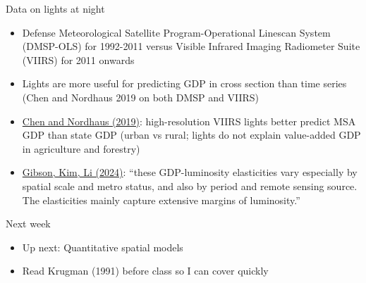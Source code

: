 \documentclass[11pt,notes=hide,aspectratio=169]{beamer}
\begin{document}
\begin{frame}{Data on lights at night}
\begin{itemize}
	\item Defense Meteorological Satellite Program-Operational Linescan System (DMSP-OLS) for 1992-2011
	versus
	Visible Infrared Imaging Radiometer Suite (VIIRS) for 2011 onwards
	\item Lights are more useful for predicting GDP in cross section than time series (Chen and Nordhaus 2019 on both DMSP and VIIRS)
	\item \href{https://www.mdpi.com/2072-4292/11/9/1057}{Chen and Nordhaus (2019)}: high-resolution VIIRS lights better predict MSA GDP than state GDP (urban vs rural; lights do not explain value-added GDP in agriculture and forestry)
	\item \href{https://ideas.repec.org/p/wai/econwp/24-08.html}{Gibson, Kim, Li (2024)}: ``these GDP-luminosity elasticities vary especially by spatial scale and metro status, and also by period and remote sensing source. The elasticities mainly capture extensive margins of luminosity.''
\end{itemize}
\end{frame}
\begin{frame}{Next week}
\begin{itemize}
\item Up next: Quantitative spatial models
\item Read Krugman (1991) before class so I can cover quickly
\end{itemize}
\end{frame}
\end{document}
